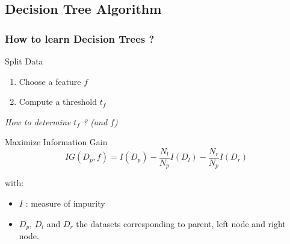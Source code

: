 \documentclass[11pt]{beamer}
\begin{document}
\subsection{Decision Tree Algorithm}

\begin{frame}
  \frametitle{How to learn Decision Trees ? }
  \begin{block}{Split Data}
    \begin{enumerate}
    \item Choose a feature $f$
    \item Compute a threshold $t_f$
    \end{enumerate}
    \pause
  \end{block}
  \begin{center}
    \emph{How to determine $t_f$ ? (and $f$) }
  \end{center}
  \pause
  \begin{block}{Maximize Information Gain}
    $$
    IG(D_p,f)  = I(D_p) - \frac{N_l}{N_p} I(D_l) - \frac{N_r}{N_p} I(D_r)
    $$

    with:
    \begin{itemize}
    \item $I$ : measure of impurity
    \item $D_p$, $D_l$ and $D_r$ the datasets corresponding to parent, left node and right node.
    \end{itemize}

  \end{block}
\end{frame}
\end{document}
